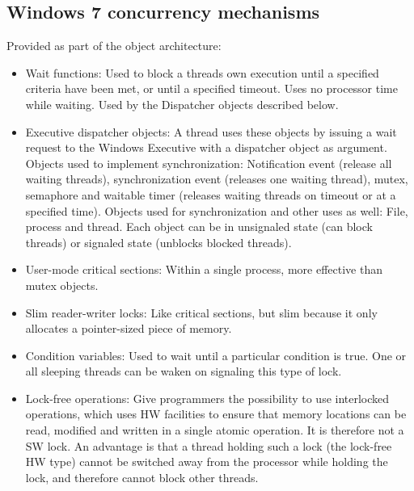 \subsection{Windows 7 concurrency mechanisms}
Provided as part of the object architecture:
\begin{itemize}
    \item Wait functions: Used to block a threads own execution until a specified criteria have been met, or until a specified timeout. Uses no processor time while waiting. Used by the Dispatcher objects described below.
    \item Executive dispatcher objects: A thread uses these objects by issuing a wait request to the Windows Executive with a dispatcher object as argument.\newline
    Objects used to implement synchronization: Notification event (release all waiting threads), synchronization event (releases one waiting thread), mutex, semaphore and waitable timer (releases waiting threads on timeout or at a specified time).\newline
    Objects used for synchronization and other uses as well: File, process and thread.\newline
    Each object can be in unsignaled state (can block threads) or signaled state (unblocks blocked threads).
    \item User-mode critical sections: Within a single process, more effective than mutex objects.
    \item Slim reader-writer locks: Like critical sections, but slim because it only allocates a pointer-sized piece of memory.
    \item Condition variables: Used to wait until a particular condition is true. One or all sleeping threads can be waken on signaling this type of lock.
    \item Lock-free operations: Give programmers the possibility to use interlocked operations, which uses HW facilities to ensure that memory locations can be read, modified and written in a single atomic operation. It is therefore not a SW lock. An advantage is that a thread holding such a lock (the lock-free HW type) cannot be switched away from the processor while holding the lock, and therefore cannot block other threads.
\end{itemize}

